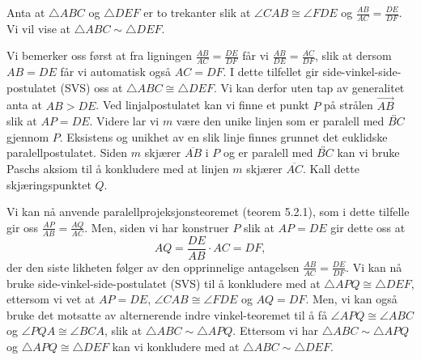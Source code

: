 \begin{oppgave}[5.3.2]
    Anta at $\triangle ABC$ og $\triangle DEF$ er to trekanter slik at $\angle CAB\cong \angle FDE$ og $\frac{AB}{AC}=\frac{DE}{DF}$. 
    Vi vil vise at $\triangle ABC \sim \triangle DEF$. 

    Vi bemerker oss først at fra ligningen $\frac{AB}{AC}=\frac{DE}{DF}$ får vi $\frac{AB}{DE}=\frac{AC}{DF}$, slik at dersom $AB=DE$ får vi automatisk også $AC=DF$. 
    I dette tilfellet gir side-vinkel-side-postulatet (SVS) oss at $\triangle ABC\cong \triangle DEF$. 
    Vi kan derfor uten tap av generalitet anta at $AB>DE$. 
    Ved linjalpostulatet kan vi finne et punkt $P$ på strålen $\overrightarrow{AB}$ slik at $AP=DE$. 
    Videre lar vi $m$ være den unike linjen som er paralell med $\overleftrightarrow{BC}$ gjennom $P$. 
    Eksistens og unikhet av en slik linje finnes grunnet det euklidske paralellpostulatet. 
    Siden $m$ skjærer $\overline{AB}$ i $P$ og er paralell med $\overleftrightarrow{BC}$ kan vi bruke Paschs aksiom til å konkludere med at linjen $m$ skjærer $\overline{AC}$. 
    Kall dette skjæringspunktet $Q$. 

    \begin{figure}
        
    \end{figure}

    Vi kan nå anvende paralellprojeksjonsteoremet (teorem 5.2.1), som i dette tilfelle gir oss $\frac{AP}{AB}=\frac{AQ}{AC}$. 
    Men, siden vi har konstruer $P$ slik at $AP=DE$ gir dette oss at 
    $$AQ=\frac{DE}{AB}\cdot AC = DF,$$
    der den siste likheten følger av den opprinnelige antagelsen $\frac{AB}{AC}=\frac{DE}{DF}$. 
    Vi kan nå bruke side-vinkel-side-postulatet (SVS) til å konkludere med at $\triangle APQ\cong \triangle DEF$, ettersom vi vet at $AP=DE$, $\angle CAB\cong \angle FDE$ og $AQ=DF$. 
    Men, vi kan også bruke det motsatte av alternerende indre vinkel-teoremet til å få $\angle APQ\cong \angle ABC$ og $\angle PQA\cong \angle BCA$, slik at $\triangle ABC\sim\triangle APQ$. 
    Ettersom vi har $\triangle ABC\sim\triangle APQ$ og $\triangle APQ\cong \triangle DEF$ kan vi konkludere med at $\triangle ABC\sim\triangle DEF$.  
\end{oppgave}

\begin{oppgave}[5.3.3]

\end{oppgave}

\begin{oppgave}[5.4.1]

\end{oppgave}

